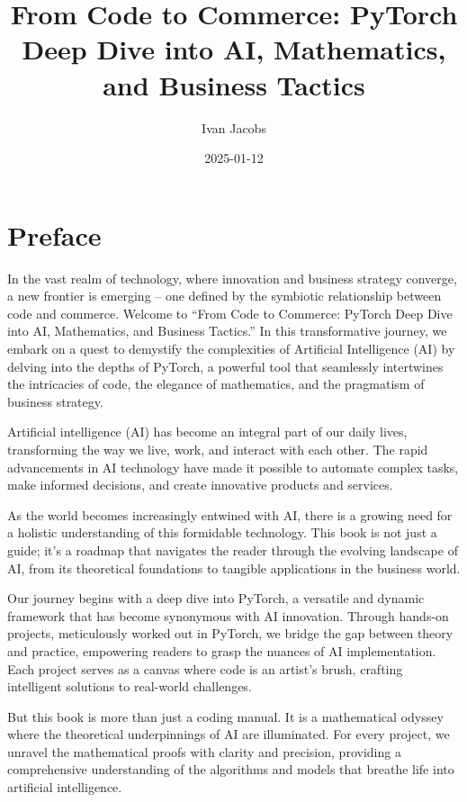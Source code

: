 \documentclass[
  letterpaper,
  DIV=11,
  numbers=noendperiod]{scrreprt}
\title{From Code to Commerce: PyTorch Deep Dive into AI, Mathematics,
and Business Tactics}
\author{Ivan Jacobs}
\date{2025-01-12}
\renewcommand*\contentsname{Table of contents}
\newcommand\contentsname{Table of contents}
\begin{document}
\maketitle

\renewcommand*\contentsname{Table of contents}
{
\hypersetup{linkcolor=}
\setcounter{tocdepth}{2}
\tableofcontents
}

\chapter*{Preface}\label{preface}


In the vast realm of technology, where innovation and business strategy
converge, a new frontier is emerging -- one defined by the symbiotic
relationship between code and commerce. Welcome to ``From Code to
Commerce: PyTorch Deep Dive into AI, Mathematics, and Business
Tactics.'' In this transformative journey, we embark on a quest to
demystify the complexities of Artificial Intelligence (AI) by delving
into the depths of PyTorch, a powerful tool that seamlessly intertwines
the intricacies of code, the elegance of mathematics, and the pragmatism
of business strategy.

Artificial intelligence (AI) has become an integral part of our daily
lives, transforming the way we live, work, and interact with each other.
The rapid advancements in AI technology have made it possible to
automate complex tasks, make informed decisions, and create innovative
products and services.

As the world becomes increasingly entwined with AI, there is a growing
need for a holistic understanding of this formidable technology. This
book is not just a guide; it's a roadmap that navigates the reader
through the evolving landscape of AI, from its theoretical foundations
to tangible applications in the business world.

Our journey begins with a deep dive into PyTorch, a versatile and
dynamic framework that has become synonymous with AI innovation. Through
hands-on projects, meticulously worked out in PyTorch, we bridge the gap
between theory and practice, empowering readers to grasp the nuances of
AI implementation. Each project serves as a canvas where code is an
artist's brush, crafting intelligent solutions to real-world challenges.

But this book is more than just a coding manual. It is a mathematical
odyssey where the theoretical underpinnings of AI are illuminated. For
every project, we unravel the mathematical proofs with clarity and
precision, providing a comprehensive understanding of the algorithms and
models that breathe life into artificial intelligence.
\end{document}

